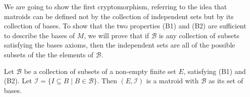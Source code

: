 We are going to show the first cryptomorphism, referring to the idea that matroids can be defined not by the collection of independent sets but by its collection of bases. To show that the two properties (B1) and (B2) are sufficient to describe the bases of $M$, we will prove that if $\mathcal{B}$ is any collection of subsets satisfying the bases axioms, then the independent sets are all of the possible subsets of the the elements of $\mathcal{B}$.

\begin{theorem}
    Let $\mathcal{B}$ be a collection of subsets of a non-empty finite set $E$, satisfying (B1) and (B2). Let $\mathcal{I}=\{ I\subseteq B \; | \; B\in\mathcal{B} \}$. Then $(E,\mathcal{I})$ is a matroid with $\mathcal{B}$ as its set of bases.
\end{theorem}



